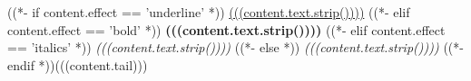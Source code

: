 ((*- if content.effect == 'underline' *))
 \underline{(((content.text.strip())))}
((*- elif content.effect == 'bold' *))
 \textbf{(((content.text.strip())))}
((*- elif content.effect == 'italics' *))
 \textit{(((content.text.strip())))}
((*- else *))
 \emph{(((content.text.strip())))} 
((*- endif *))(((content.tail)))
